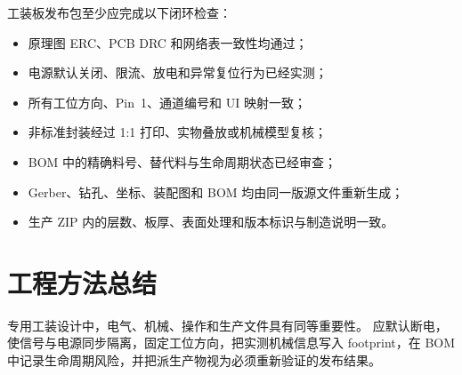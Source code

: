 工装板发布包至少应完成以下闭环检查：
\begin{itemize}
  \item 原理图 ERC、PCB DRC 和网络表一致性均通过；
  \item 电源默认关闭、限流、放电和异常复位行为已经实测；
  \item 所有工位方向、Pin~1、通道编号和 UI 映射一致；
  \item 非标准封装经过 1:1 打印、实物叠放或机械模型复核；
  \item BOM 中的精确料号、替代料与生命周期状态已经审查；
  \item Gerber、钻孔、坐标、装配图和 BOM 均由同一版源文件重新生成；
  \item 生产 ZIP 内的层数、板厚、表面处理和版本标识与制造说明一致。
\end{itemize}

\section{工程方法总结}

专用工装设计中，电气、机械、操作和生产文件具有同等重要性。
应默认断电，使信号与电源同步隔离，固定工位方向，把实测机械信息写入 footprint，在 BOM 中记录生命周期风险，并把派生产物视为必须重新验证的发布结果。
